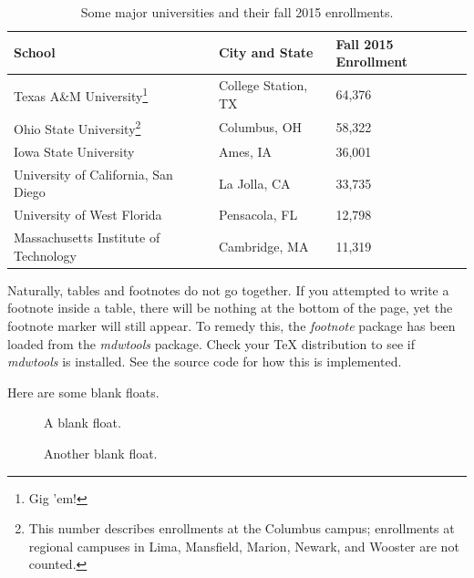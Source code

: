 \begin{savenotes}
	\begin{table}[h!]
		\centering
		\label{my-label}
		\begin{tabular}{|l|l|l|}
			\hline
			School                                                                                                                                                                                      & City and State      & Fall 2015 Enrollment \\ \hline
			Texas A\&M University\footnote{Gig 'em!}                                                                                                                                                    & College Station, TX & 64,376               \\ \hline
			Ohio State University\footnote{This number describes enrollments at the Columbus campus; enrollments at regional campuses in Lima, Mansfield, Marion, Newark, and Wooster are not counted.} & Columbus, OH        & 58,322               \\ \hline
			Iowa State University                                                                                                                                                                       & Ames, IA            & 36,001               \\ \hline
			University of California, San Diego                                                                                                                                                         & La Jolla, CA        & 33,735               \\ \hline
			University of West Florida                                                                                                                                                                  & Pensacola, FL       & 12,798               \\ \hline
			Massachusetts Institute of Technology                                                                                                                                                       & Cambridge, MA       & 11,319               \\ \hline
		\end{tabular}
		\caption{Some major universities and their fall 2015 enrollments.}
	\end{table}
\end{savenotes}

Naturally, tables and footnotes do not go together. If you attempted to write a footnote inside a table, there will be nothing at the bottom of the page, yet the footnote marker will still appear. To remedy this, the \textit{footnote} package has been loaded from the \textit{mdwtools} package. Check your TeX distribution to see if \textit{mdwtools} is installed. See the source code for how this is implemented.

Here are some blank floats.

\begin{figure}[!h]
	\caption{A blank float.}
\end{figure}

\begin{figure}[!h]
	\caption{Another blank float.}
\end{figure}